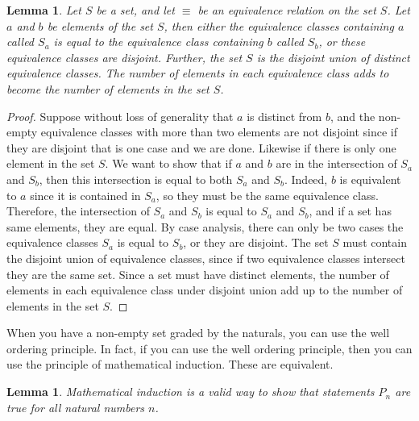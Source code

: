 \documentclass[10pt,twocolumn]{article}
\newtheorem{lemma}[theorem]{Lemma}
\begin{document}
\begin{lemma}
    Let $S$ be a set, and let $\equiv$ be an equivalence relation on the set $S$.
    Let $a$ and $b$ be elements of the set $S$, then either 
    the equivalence classes containing $a$ called $S_{a}$ is equal to the 
    equivalence class containing $b$ called $S_{b}$, or these equivalence classes are disjoint.
    Further, the set $S$ is the disjoint union of distinct equivalence classes.
    The number of elements in each equivalence class adds to become the number of elements in the set $S$.
\end{lemma}

\begin{proof}
    Suppose without loss of generality that $a$ is distinct from $b$, and the non-empty equivalence classes
    with more than two elements are not disjoint since if they are disjoint that is one case and we are done.
    Likewise if there is only one element in the set $S$.
    We want to show that if $a$ and $b$ are in the intersection of $S_{a}$ and $S_{b}$, then this intersection is equal to
    both $S_a$ and $S_b$. Indeed, $b$ is equivalent to $a$ since it is contained in $S_a$, so they must be the same equivalence class.
    Therefore, the intersection of $S_{a}$ and $S_{b}$ is equal to $S_a$ and $S_b$, and if a set has same elements, they are equal.
    By case analysis, there can only be two cases the equivalence classes $S_a$ is equal to $S_b$, or they are disjoint.
    The set $S$ must contain the disjoint union of equivalence classes, since if two equivalence classes intersect they are the same set.
    Since a set must have distinct elements, the number of elements in each equivalence class under disjoint union add up to the number of elements in the set $S$.
\end{proof}

When you have a non-empty set graded by the naturals, you can use the well ordering principle. In fact, if you can use the well ordering principle, then you can use the principle of mathematical induction. These are equivalent.

\begin{lemma}
    Mathematical induction is a valid way to show that statements $P_n$ are true for all natural numbers $n$.
\end{lemma}
\end{document}
